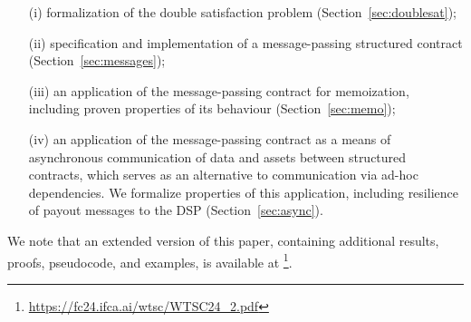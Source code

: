 \begin{itemize}
\item[(i)] formalization of the double satisfaction problem (Section~\ref{sec:doublesat});
\item[(ii)] specification and implementation of a message-passing structured contract (Section~\ref{sec:messages});
\item[(iii)] an application of the message-passing contract for memoization,
including proven properties of its behaviour (Section~\ref{sec:memo});
\item[(iv)] an application of the message-passing contract as a means of asynchronous
communication of data and assets between structured contracts, which serves as an alternative
to communication via ad-hoc dependencies. We formalize
properties of this application, including resilience of payout messages to the DSP (Section~\ref{sec:async}).
\end{itemize}

We note that an extended version of this paper, containing additional results, proofs,
pseudocode, and examples, is available at \footnote{%
\url{https://fc24.ifca.ai/wtsc/WTSC24_2.pdf}}.
